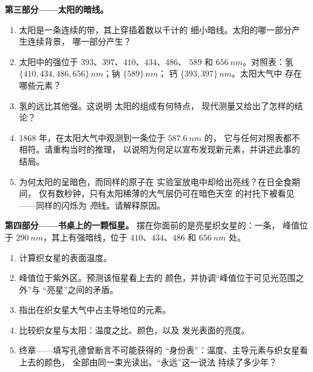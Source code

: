 \begin{problem}
\medskip
\noindent\textbf{第三部分——太阳的暗线。}
\begin{enumerate}[resume]
  \item 太阳是一条连续的带，其上穿插着数以千计的
        细小暗线。太阳的哪一部分产生连续背景，
        哪一部分产生？
  \item 太阳中的强位于 $393$、$397$、$410$、$434$、$486$、
        $589$ 和 $\qty{656}{nm}$。对照表：氢
        $\{410, 434, 486, 656\}\,\unit{nm}$；钠 $\{589\}\,\unit{nm}$；
        钙 $\{393, 397\}\,\unit{nm}$。太阳大气中
        存在哪些元素？
  \item 氢的远比其他强。这说明
        太阳的组成有何特点，
        现代测量又给出了怎样的结论？
  \item 1868 年，在太阳大气中观测到一条位于 $\qty{587.6}{nm}$ 的，
        它与任何对照表都不相符。请重构当时的推理，
        以说明为何足以宣布发现新元素，并讲述此事的结局。
  \item 为何太阳的呈暗色，而同样的原子在
        实验室放电中却给出亮线？在日全食期间，
        仅有数秒钟，只有太阳稀薄的大气层仍可在暗色天空
        的衬托下被看见——同样的闪烁为
        \emph{亮}线。请解释原因。
\end{enumerate}

\medskip
\noindent\textbf{第四部分——书桌上的一颗恒星。}
摆在你面前的是亮星织女星的：一条，
峰值位于 $\qty{290}{nm}$，其上有强暗线，位于
$410$、$434$、$486$ 和 $\qty{656}{nm}$ 处。
\begin{enumerate}[resume]
  \item 计算织女星的表面温度。
  \item 峰值位于紫外区。预测该恒星看上去的
        颜色，并协调“峰值位于可见光范围之外”与
        “亮星”之间的矛盾。
  \item 指出在织女星大气中占主导地位的元素。
  \item 比较织女星与太阳：温度之比、颜色，以及
        发光表面的亮度。
  \item 终章——填写孔德曾断言不可能获得的
        “身份表”：温度、主导元素与织女星看上去的颜色，
        全部由同一束光读出。“永远”这一说法
        持续了多少年？
\end{enumerate}
\end{problem}
